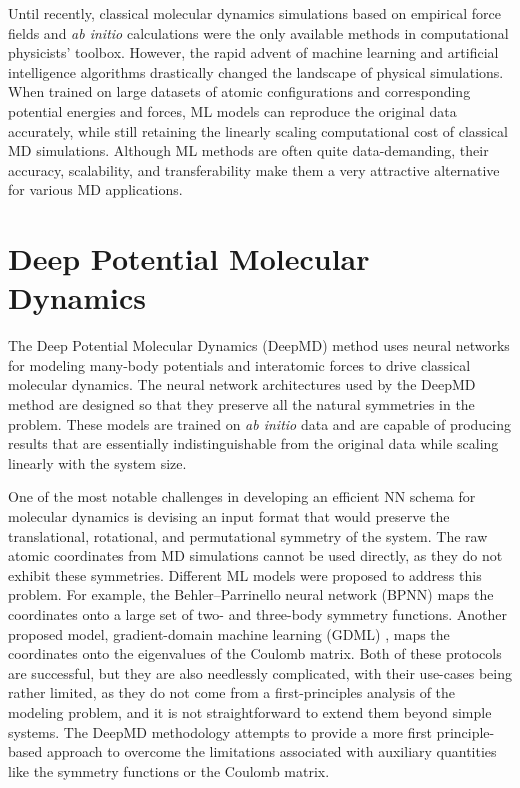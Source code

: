 Until recently, classical molecular dynamics simulations based on empirical
force fields and \textit{ab initio} calculations were the only available
methods in computational physicists' toolbox. However, the rapid advent of
machine learning and artificial intelligence algorithms drastically changed
the landscape of physical simulations. When trained on large datasets of
atomic configurations and corresponding potential energies and forces,
ML models can reproduce the original data accurately, while still retaining
the linearly scaling computational cost of classical MD simulations. Although
ML methods are often quite data-demanding, their accuracy, scalability, and
transferability make them a very attractive alternative for various MD
applications.

\section{Deep Potential Molecular Dynamics}

The Deep Potential Molecular Dynamics (DeepMD) \parencite{Zhang_2018} method
uses neural networks for modeling many-body potentials and interatomic forces
to drive classical molecular dynamics. The neural network architectures used
by the DeepMD method are designed so that they preserve all the natural
symmetries in the problem. These models are trained on \textit{ab initio} data
and are capable of producing results that are essentially indistinguishable
from the original data while scaling linearly with the system size.

One of the most notable challenges in developing an efficient NN schema for
molecular dynamics is devising an input format that would preserve the
translational, rotational, and permutational symmetry of the system. The raw
atomic coordinates from MD simulations cannot be used directly, as they do not
exhibit these symmetries. Different ML models were proposed to address this
problem. For example, the Behler--Parrinello neural network (BPNN)
\parencite{PhysRevLett.98.146401} maps the coordinates onto a large set of
two- and three-body symmetry functions. Another proposed model,
gradient-domain machine learning (GDML)
\parencite{doi:10.1126/sciadv.1603015}, maps the coordinates onto the
eigenvalues of the Coulomb matrix. Both of these protocols are successful, but
they are also needlessly complicated, with their use-cases being rather
limited, as they do not come from a first-principles analysis of the modeling
problem, and it is not straightforward to extend them beyond simple systems.
The DeepMD methodology attempts to provide a more first principle-based
approach to overcome the limitations associated with auxiliary quantities like
the symmetry functions or the Coulomb matrix.

